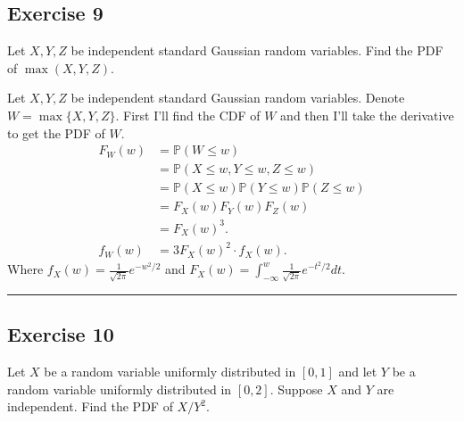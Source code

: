 \documentclass{article}
\theoremstyle{break}
\newenvironment{solution}{{\bf Solution:}}{\hfill\rule{2mm}{2mm}}
\renewcommand{\P}{\mathbb{P}}
\begin{document}
\subsection*{Exercise 9}
Let $X,Y,Z$ be independent standard Gaussian random variables. Find the PDF of $\max(X,Y,Z)$.

\begin{solution}
Let $X, Y, Z$ be independent standard Gaussian random variables. Denote $W = \max\{X,Y,Z\}$.
First I'll find the CDF of $W$ and then I'll take the derivative to get the PDF of $W$.
\begin{align*}
F_W(w) &= \P(W \leq w) \\
	&= \P( X \leq w, Y \leq w, Z \leq w) \\
	&= \P(X \leq w) \P(Y \leq w) \P(Z \leq w) \\
	&= F_X(w) F_Y(w) F_Z(w) \\
	&= F_X(w)^3. \\
f_W(w) &= 3F_X(w)^2 \cdot f_X(w).	
\end{align*}
Where $f_X(w) = \frac{1}{\sqrt{2\pi}} e^{-w^2/2}$ and $F_X(w) = \int_{-\infty}^w \frac{1}{\sqrt{2\pi}} e^{-t^2/2} dt$.

\end{solution}


\subsection*{Exercise 10}
Let $X$ be a random variable uniformly distributed in $[0,1]$ and let $Y$ be a random variable uniformly distributed in $[0,2]$. Suppose $X$ and $Y$ are independent. Find the PDF of $X/Y^2$.
\end{document}
